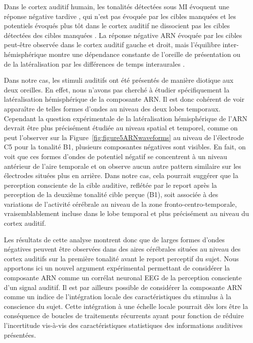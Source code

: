 Dans le cortex auditif humain, les tonalités détectées sous MI évoquent une réponse négative tardive \citep{gutschalk2008neural}, qui n'est pas évoquée par les cibles manquées et les potentiels évoqués plus tôt dans le cortex auditif ne dissocient pas les cibles détectées des cibles manquées \citep{gutschalk2008neural, konigs2012functional, prilop2017auditory}.
La réponse négative ARN évoquée par les cibles peut-être observée dans le cortex auditif gauche et droit, mais l'équilibre inter-hémisphérique montre une dépendance constante de l'oreille de présentation ou de la latéralisation par les différences de temps interaurales \citep{konigs2012functional, prilop2017auditory}. 

Dans notre cas, les stimuli auditifs ont été présentés de manière diotique aux deux oreilles.
En effet, nous n'avons pas cherché à étudier spécifiquement la latéralisation hémisphérique de la composante ARN. 
Il est donc cohérent de voir apparaître de telles formes d'ondes au niveau des deux lobes temporaux. 
Cependant la question expérimentale de la latéralisation hémisphérique de l'ARN devrait être plus précisément étudiée au niveau spatial et temporel, comme on peut l'observer sur la Figure~\ref{fig:figure5ARNwaveforms} au niveau de l'électrode C5 pour la tonalité B1, plusieurs composantes négatives sont visibles. 
En fait, on voit que ces formes d'ondes de potentiel négatif se concentrent à un niveau antérieur de l'aire temporale et on observe aucun autre pattern similaire sur les électrodes situées plus en arrière. 
Dans notre cas, cela pourrait suggérer que la perception consciente de la cible auditive, reflétée par le report après la perception de la deuxième tonalité cible perçue (B1), soit associée à des variations de l'activité cérébrale au niveau de la zone fronto-centro-temporale, vraisemblablement incluse dans le lobe temporal et plus précisément au niveau du cortex auditif. 

Les résultats de cette analyse montrent donc que de larges formes d'ondes négatives peuvent être observées dans des aires cérébrales situées au niveau des cortex auditifs sur la première tonalité avant le report perceptif du sujet. 
Nous apportons ici un nouvel argument expérimental permettant de considérer la composante ARN comme un corrélat neuronal EEG de la perception consciente d'un signal auditif. 
Il est par ailleurs possible de considérer la composante ARN comme un indice de l'intégration locale des caractéristiques du stimulus à la conscience du sujet. 
Cette intégration à une échelle locale pourrait dès lors être la conséquence de boucles de traitements récurrents ayant pour fonction de réduire l'incertitude vis-à-vis des caractéristiques statistiques des informations auditives présentées. 

